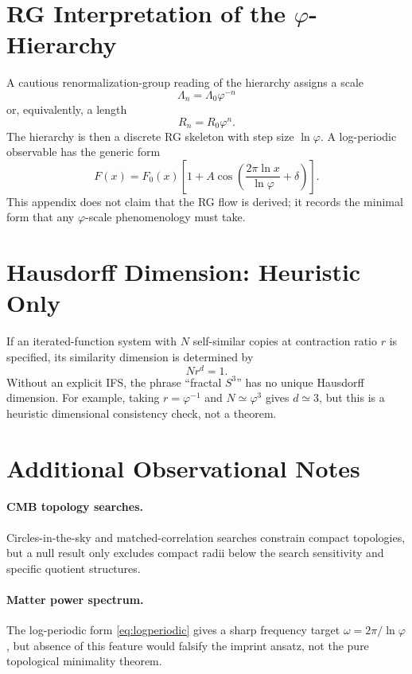 \documentclass[11pt,a4paper]{article}
\theoremstyle{definition}
\theoremstyle{remark}
\newcommand{\Sthree}{S^{3}}
\newcommand{\golden}{\varphi}
\begin{document}
\section{RG Interpretation of the \texorpdfstring{$\golden$}{phi}-Hierarchy}

A cautious renormalization-group reading of the hierarchy assigns a scale
\[
\Lambda_{n}=\Lambda_{0}\golden^{-n}
\]
or, equivalently, a length
\[
R_{n}=R_{0}\golden^{n}.
\]
The hierarchy is then a discrete RG skeleton with step size $\ln\golden$.  A log-periodic
observable has the generic form
\[
F(x)=F_{0}(x)\left[1+A\cos\left(\frac{2\pi\ln x}{\ln\golden}+\delta\right)\right].
\]
This appendix does not claim that the RG flow is derived; it records the minimal form that any
$\golden$-scale phenomenology must take.

\section{Hausdorff Dimension: Heuristic Only}

If an iterated-function system with $N$ self-similar copies at contraction ratio $r$ is specified,
its similarity dimension is determined by
\[
Nr^{d}=1.
\]
Without an explicit IFS, the phrase ``fractal $\Sthree$'' has no unique Hausdorff dimension.
For example, taking $r=\golden^{-1}$ and $N\simeq\golden^{3}$ gives $d\simeq3$, but this is a
heuristic dimensional consistency check, not a theorem.

\section{Additional Observational Notes}

\paragraph{CMB topology searches.}
Circles-in-the-sky and matched-correlation searches constrain compact topologies, but a null
result only excludes compact radii below the search sensitivity and specific quotient structures.

\paragraph{Matter power spectrum.}
The log-periodic form \eqref{eq:logperiodic} gives a sharp frequency target
$\omega=2\pi/\ln\golden$, but absence of this feature would falsify the imprint ansatz, not the
pure topological minimality theorem.
\end{document}
